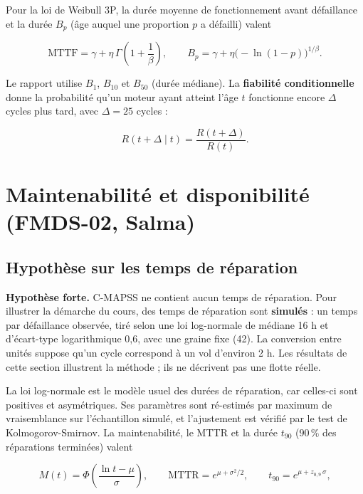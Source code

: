 Pour la loi de Weibull 3P, la durée moyenne de fonctionnement avant défaillance et la durée $B_p$ (âge auquel une proportion $p$ a défailli) valent

\begin{equation}\label{eq:mttf}
\mathrm{MTTF} = \gamma + \eta\, \Gamma\!\left(1 + \frac{1}{\beta}\right), \qquad B_p = \gamma + \eta \big(-\ln(1-p)\big)^{1/\beta}.
\end{equation}

Le rapport utilise $B_1$, $B_{10}$ et $B_{50}$ (durée médiane). La \textbf{fiabilité conditionnelle} donne la probabilité qu'un moteur ayant atteint l'âge $t$ fonctionne encore $\Delta$ cycles plus tard, avec $\Delta = 25$ cycles :

\begin{equation}\label{eq:conditionnelle}
R(t + \Delta \mid t) = \frac{R(t + \Delta)}{R(t)} .
\end{equation}

\section{Maintenabilité et disponibilité (FMDS-02, Salma)}\label{sec:fmds02}

\subsection{Hypothèse sur les temps de réparation}

\begin{problembox}\normalfont\raggedright
\textbf{Hypothèse forte.} C-MAPSS ne contient aucun temps de réparation. Pour illustrer la démarche du cours, des temps de réparation sont \textbf{simulés} : un temps par défaillance observée, tiré selon une loi log-normale de médiane 16 h et d'écart-type logarithmique 0,6, avec une graine fixe (42). La conversion entre unités suppose qu'un cycle correspond à un vol d'environ 2 h. Les résultats de cette section illustrent la méthode ; ils ne décrivent pas une flotte réelle.
\end{problembox}

La loi log-normale est le modèle usuel des durées de réparation, car celles-ci sont positives et asymétriques. Ses paramètres sont ré-estimés par maximum de vraisemblance sur l'échantillon simulé, et l'ajustement est vérifié par le test de Kolmogorov-Smirnov. La maintenabilité, le MTTR et la durée $t_{90}$ ($90\,\%$ des réparations terminées) valent

\begin{equation}\label{eq:lognormale}
M(t) = \Phi\!\left(\frac{\ln t - \mu}{\sigma}\right), \qquad \mathrm{MTTR} = e^{\mu + \sigma^2/2}, \qquad t_{90} = e^{\mu + z_{0{,}9}\,\sigma},
\end{equation}

